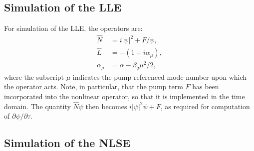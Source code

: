 \subsection{Simulation of the LLE}
For simulation of the LLE, the operators are: 
\begin{align}
\hat{N}&=i|\psi|^2+F/\psi,\\
\hat{L}&=-(1+i\alpha_\mu),\\
\alpha_\mu&=\alpha-\beta_2\mu^2/2,
\end{align}
where the subscript $\mu$ indicates the pump-referenced mode number upon which the operator acts. Note, in particular, that the pump term $F$ has been incorporated into the nonlinear operator, so that it is implemented in the time domain. The quantity $\hat{N}\psi$ then becomes $i|\psi|^2\psi+F$, as required for computation of $\partial\psi/\partial\tau$.

\subsection{Simulation of the NLSE}







	



